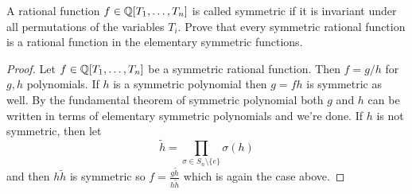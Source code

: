     \begin{ex}{14.22}
        A rational function $f\in\mathbb{Q}[T_1,\dots,T_n]$ is called symmetric if it is invariant under all permutations of the variables $T_i$. Prove that every symmetric rational function is a rational function in the elementary symmetric functions.
    \end{ex}
    \begin{proof}
        Let $f\in\mathbb{Q}[T_1,\dots,T_n]$ be a symmetric rational function. 
        Then $f=g/h$ for $g,h$ polynomials. If $h$ is a symmetric polynomial then $g=fh$ is symmetric as well.
        By the fundamental theorem of symmetric polynomial both $g$ and $h$ can be written in terms of elementary symmetric polynomials and we're done.
        If $h$ is not symmetric, then let 
        $$\tilde{h}=\prod_{\sigma\in S_n\setminus\{e\}}\sigma(h)$$
        and then $h\tilde{h}$ is symmetric so $f=\frac{g\tilde{h}}{h\tilde{h}}$ which is again the case above.
    \end{proof}

